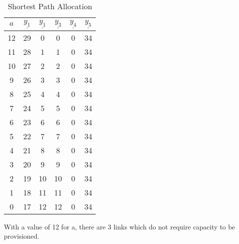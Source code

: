 \begin{table}[H]
	\centering
	\caption{Shortest Path Allocation}
	\label{tab:label}
	\begin{tabular}{||c|c|c|c|c|c||}
	\hline
	\rowcolor{gray!50}
	$a$ & $\underline{y_1}$ & $\underline{y_1}$ & $\underline{y_3}$ &
	$\underline{y_4}$ & $\underline{y_5}$ \\
	\hline
	12 & 29 & 0  & 0  & 0 & 34 \\
	11 & 28 & 1  & 1  & 0 & 34 \\
	10 & 27 & 2  & 2  & 0 & 34 \\
	9  & 26 & 3  & 3  & 0 & 34 \\
	8  & 25 & 4  & 4  & 0 & 34 \\
	7  & 24 & 5  & 5  & 0 & 34 \\
	6  & 23 & 6  & 6  & 0 & 34 \\
	5  & 22 & 7  & 7  & 0 & 34 \\
	4  & 21 & 8  & 8  & 0 & 34 \\
	3  & 20 & 9  & 9  & 0 & 34 \\
	2  & 19 & 10 & 10 & 0 & 34 \\
	1  & 18 & 11 & 11 & 0 & 34 \\
	0  & 17 & 12 & 12 & 0 & 34 \\
	\hline \hline
	\end{tabular}
\end{table}

With a value of 12 for a, there are 3 links which do not require capacity to be
provisioned.








